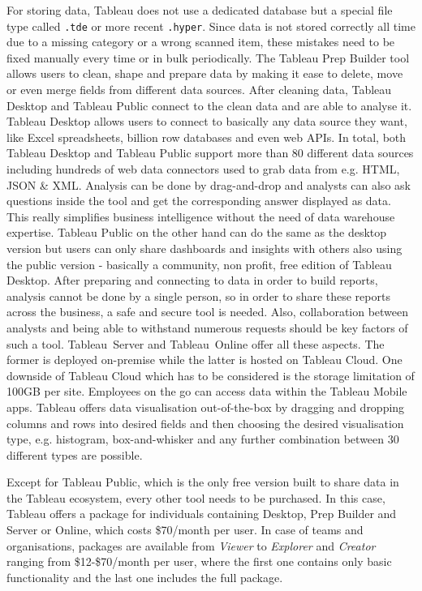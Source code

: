\documentclass[../paper.tex]{subfiles}
\begin{document}
For storing data, Tableau does not use a dedicated database but a special file
type called \texttt{.tde} or more recent \texttt{.hyper}. Since data is not
stored correctly all time due to a missing category or a wrong scanned item,
these mistakes need to be fixed manually every time or in bulk periodically.
The Tableau Prep Builder tool allows users to clean, shape and prepare data by
making it ease to delete, move or even merge fields from different data
sources. After cleaning data, Tableau Desktop and Tableau Public connect to the
clean data and are able to analyse it. Tableau Desktop allows users to connect
to basically any data source they want, like Excel spreadsheets, billion row
databases and even web APIs. In total, both Tableau Desktop and Tableau Public
support more than 80 different data sources including hundreds of web data
connectors used to grab data from e.g. HTML, JSON \& XML. Analysis can be done
by drag-and-drop and analysts can also ask questions inside the tool and get
the corresponding answer displayed as data. This really simplifies business
intelligence without the need of data warehouse expertise. Tableau Public on
the other hand can do the same as the desktop version but users can only share
dashboards and insights with others also using the public version - basically a
community, non profit, free edition of Tableau Desktop. After preparing and
connecting to data in order to build reports, analysis cannot be done by a
single person, so in order to share these reports across the business, a safe
and secure tool is needed. Also, collaboration between analysts and being able
to withstand numerous requests should be key factors of such a tool.
Tableau~Server and Tableau~Online offer all these aspects. The former is
deployed on-premise while the latter is hosted on Tableau Cloud. One downside
of Tableau Cloud which has to be considered is the storage limitation of 100GB
per site. Employees on the go can access data within the Tableau Mobile apps.
Tableau offers data visualisation out-of-the-box by dragging and dropping
columns and rows into desired fields and then choosing the desired
visualisation type, e.g. histogram, box-and-whisker and any further combination
between 30 different types are possible.

Except for Tableau Public, which is the only free version built to share data
in the Tableau ecosystem, every other tool needs to be purchased. In this case,
Tableau offers a package for individuals containing Desktop, Prep Builder and
Server or Online, which costs \$70/month per user. In case of teams and
organisations, packages are available from \textit{Viewer} to \textit{Explorer}
and \textit{Creator} ranging from \$12-\$70/month per user, where the first one
contains only basic functionality and the last one includes the full package.
\end{document}
